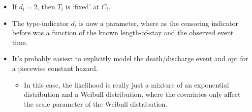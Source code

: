 \documentclass[
  10pt,
  a4paper,
]{article}
\providecommand{\tightlist}{%
  \setlength{\itemsep}{0pt}\setlength{\parskip}{0pt}}
\begin{document}
\begin{itemize}
\tightlist
\item
  If \(d_{i} = 2\), then \(T_{i}\) is `fixed' at \(C_{i}\).
\item
  The type-indicator \(d_{i}\) is now a parameter, where as the
  censoring indicator before was a function of the known length-of-stay
  and the observed event time.
\item
  It's probably easiest to explicitly model the death/discharge event
  and opt for a piecewise constant hazard.

  \begin{itemize}
  \tightlist
  \item
    In this case, the likelihood is really just a mixture of an
    exponential distribution and a Weibull distribution, where the
    covariates only affect the scale parameter of the Weibull
    distribution.
  \end{itemize}
\end{itemize}
\end{document}
